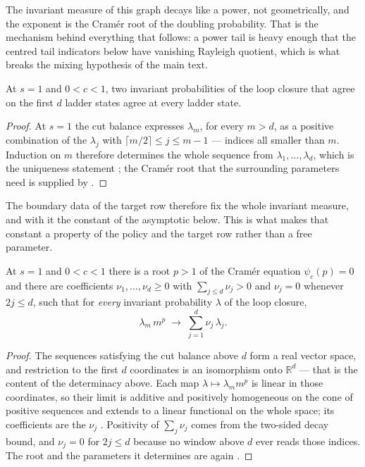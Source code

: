 \noindent The invariant measure of this graph decays like a power, not geometrically, and the exponent is
the Cram\'er root of the doubling probability. That is the mechanism behind everything that
follows: a power tail is heavy enough that the centred tail indicators below have vanishing
Rayleigh quotient, which is what breaks the mixing hypothesis of the main text.


\begin{theorem}
  \label{thm:main_constant_determined}
At $s=1$ and $0<c<1$, two invariant probabilities of the loop closure that agree on the first
$d$ ladder states agree at every ladder state.
\end{theorem}

\begin{proof}
At $s=1$ the cut balance expresses $\lambda_m$, for every $m>d$, as a positive combination of
the $\lambda_j$ with $\lceil m/2\rceil\leq j\leq m-1$ — indices all smaller than $m$. Induction
on $m$ therefore determines the whole sequence from $\lambda_1,\dots,\lambda_d$, which is the
uniqueness statement ; the Cramér root that the
surrounding parameters need is supplied by .
\end{proof}

\noindent The boundary data of the target row therefore fix the whole invariant measure, and with it the
constant of the asymptotic below. This is what makes that constant a property of the policy and
the target row rather than a free parameter.


\begin{theorem}
  \label{thm:main_constant_functional}
At $s=1$ and $0<c<1$ there is a root $p>1$ of the Cramér equation $\psi_c(p)=0$ and there are
coefficients $\nu_1,\dots,\nu_d\geq0$ with $\sum_{j\leq d}\nu_j>0$ and $\nu_j=0$ whenever
$2j\leq d$, such that for \emph{every} invariant probability $\lambda$ of the loop closure,
\[ \lambda_m\,m^{p}\;\longrightarrow\;\sum_{j=1}^{d}\nu_j\,\lambda_j . \]
\end{theorem}

\begin{proof}
The sequences satisfying the cut balance above $d$ form a real vector space, and restriction to
the first $d$ coordinates is an isomorphism onto $\mathbb R^{d}$ — that is the content of the
determinacy above. Each map $\lambda\mapsto\lambda_m m^{p}$ is linear in those coordinates, so
their limit is additive and positively homogeneous on the cone of positive sequences and
extends to a linear functional on the whole space; its coefficients are the $\nu_j$
. Positivity of $\sum_j\nu_j$ comes from the
two-sided decay bound, and $\nu_j=0$ for $2j\leq d$ because no window above $d$ ever reads
those indices. The root and the parameters it determines are again
.
\end{proof}


